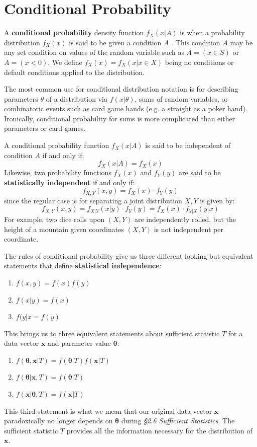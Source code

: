 \documentclass[10pt, a5paper, twoside, openright]{memoir}
\begin{document}
\section{Conditional Probability}
A \textbf{conditional probability} density function $f_X(x|A)$ is when a probability distribution $f_X(x)$ is said to be given a condition $A$ . This condition $A$ may be any set condition on values of the random variable such as $A= (x \in S)$ or $A= (x < 0)$. We define $f_X(x) = f_X(x|x \in X)$ being no conditions or default conditions applied to the distribution.

The most common use for conditional distribution notation is for describing parameters $\theta$ of a distribution via $f(x|\theta)$, sums of random variables, or combinatoric events such as card game hands (e.g. a straight as a poker hand). Ironically, conditional probability for sums is more complicated than either parameters or card games.

A conditional probability function $f_X(x|A)$ is said to be independent of condition $A$ if and only if:
$$f_X(x|A) = f_X(x)$$
Likewise, two probability functions $f_X(x)$ and $f_Y(y)$ are said to be \textbf{statistically independent} if and only if:
$$f_{X,Y}(x,y) = f_X(x) \cdot f_Y(y)$$
since the regular case is for separating a joint distribution $X,Y$ is given by:
$$f_{X,Y}(x,y) = f_{X|Y}(x|y) \cdot f_Y(y) = f_X(x) \cdot f_{Y|X}(y|x) $$
For example, two dice rolls upon $(X,Y)$ are independently rolled, but the height of a mountain given coordinates $(X, Y)$ is not independent per coordinate.

The rules of conditional probability give us three different looking but equivalent statements that define \textbf{statistical independence}:
\begin{enumerate}
\item $f(x, y) = f(x) f(y)$
\item $f(x|y) = f(x)$
\item $f(y|x = f(y)$
\end{enumerate}
This brings us to three equivalent statements about sufficient statistic $T$ for a data vector $\boldsymbol x$ and parameter value $\boldsymbol \theta$:
\begin{enumerate}
\item $f(\boldsymbol \theta, \boldsymbol x | T) = f(\boldsymbol \theta | T) f(\boldsymbol x | T)$
\item $f(\boldsymbol \theta | \boldsymbol x, T) = f(\boldsymbol \theta | T)$
\item $f(\boldsymbol x| \boldsymbol \theta, T) = f(\boldsymbol x | T)$
\end{enumerate}
This third statement is what we mean that our original data vector $\boldsymbol x$ paradoxically no longer depends on $\boldsymbol \theta$ during \textit{\S 2.6 Sufficient Statistics}. The sufficient statistic $T$ provides all the information necessary for the distribution of $\boldsymbol x$.
\end{document}
